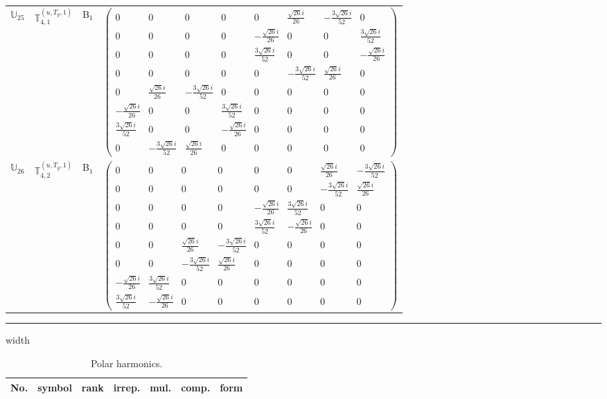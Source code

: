 \documentclass[fleqn,10pt,landscape]{article}
\begin{document}
\begin{itemize}
\begin{center}
\begin{longtable}{c|c|c|c}
$ \mathbb{U}_{25} $ & $\mathbb{T}_{4,1}^{(u,T_{g},1)}$ & B$_{1}$ & $\begin{pmatrix} 0 & 0 & 0 & 0 & 0 & \frac{\sqrt{26} i}{26} & - \frac{3 \sqrt{26} i}{52} & 0 \\ 0 & 0 & 0 & 0 & - \frac{\sqrt{26} i}{26} & 0 & 0 & \frac{3 \sqrt{26} i}{52} \\ 0 & 0 & 0 & 0 & \frac{3 \sqrt{26} i}{52} & 0 & 0 & - \frac{\sqrt{26} i}{26} \\ 0 & 0 & 0 & 0 & 0 & - \frac{3 \sqrt{26} i}{52} & \frac{\sqrt{26} i}{26} & 0 \\ 0 & \frac{\sqrt{26} i}{26} & - \frac{3 \sqrt{26} i}{52} & 0 & 0 & 0 & 0 & 0 \\ - \frac{\sqrt{26} i}{26} & 0 & 0 & \frac{3 \sqrt{26} i}{52} & 0 & 0 & 0 & 0 \\ \frac{3 \sqrt{26} i}{52} & 0 & 0 & - \frac{\sqrt{26} i}{26} & 0 & 0 & 0 & 0 \\ 0 & - \frac{3 \sqrt{26} i}{52} & \frac{\sqrt{26} i}{26} & 0 & 0 & 0 & 0 & 0 \end{pmatrix}$ \\
$ \mathbb{U}_{26} $ & $\mathbb{T}_{4,2}^{(u,T_{g},1)}$ & B$_{1}$ & $\begin{pmatrix} 0 & 0 & 0 & 0 & 0 & 0 & \frac{\sqrt{26} i}{26} & - \frac{3 \sqrt{26} i}{52} \\ 0 & 0 & 0 & 0 & 0 & 0 & - \frac{3 \sqrt{26} i}{52} & \frac{\sqrt{26} i}{26} \\ 0 & 0 & 0 & 0 & - \frac{\sqrt{26} i}{26} & \frac{3 \sqrt{26} i}{52} & 0 & 0 \\ 0 & 0 & 0 & 0 & \frac{3 \sqrt{26} i}{52} & - \frac{\sqrt{26} i}{26} & 0 & 0 \\ 0 & 0 & \frac{\sqrt{26} i}{26} & - \frac{3 \sqrt{26} i}{52} & 0 & 0 & 0 & 0 \\ 0 & 0 & - \frac{3 \sqrt{26} i}{52} & \frac{\sqrt{26} i}{26} & 0 & 0 & 0 & 0 \\ - \frac{\sqrt{26} i}{26} & \frac{3 \sqrt{26} i}{52} & 0 & 0 & 0 & 0 & 0 & 0 \\ \frac{3 \sqrt{26} i}{52} & - \frac{\sqrt{26} i}{26} & 0 & 0 & 0 & 0 & 0 & 0 \end{pmatrix}$ \\
\end{longtable}
\end{center}

 \hfil \hrule height 1mm width \textwidth \hfil

\begin{center}
\renewcommand{\arraystretch}{1.3}
\begin{longtable}{ccccccc}
\caption{Polar harmonics.}
 \\
 \hline \hline
No. & symbol & rank & irrep. & mul. & comp. & form \\ \hline \endfirsthead


\end{longtable}
\end{center}
\end{itemize}
\end{document}
